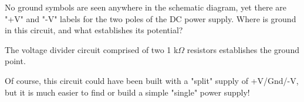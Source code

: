 

No ground symbols are seen anywhere in the schematic diagram, yet there are "+V" and "-V" labels for the two poles of the DC power supply.  Where is ground in this circuit, and what establishes its potential?







The voltage divider circuit comprised of two 1 k$\Omega$ resistors establishes the ground point.







Of course, this circuit could have been built with a "split" supply of +V/Gnd/-V, but it is much easier to find or build a simple "single" power supply!




